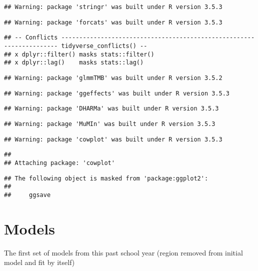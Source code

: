 \documentclass[]{article}
\begin{document}
\begin{verbatim}
## Warning: package 'stringr' was built under R version 3.5.3
\end{verbatim}

\begin{verbatim}
## Warning: package 'forcats' was built under R version 3.5.3
\end{verbatim}

\begin{verbatim}
## -- Conflicts --------------------------------------------------------------------- tidyverse_conflicts() --
## x dplyr::filter() masks stats::filter()
## x dplyr::lag()    masks stats::lag()
\end{verbatim}

\begin{verbatim}
## Warning: package 'glmmTMB' was built under R version 3.5.2
\end{verbatim}

\begin{verbatim}
## Warning: package 'ggeffects' was built under R version 3.5.3
\end{verbatim}

\begin{verbatim}
## Warning: package 'DHARMa' was built under R version 3.5.3
\end{verbatim}

\begin{verbatim}
## Warning: package 'MuMIn' was built under R version 3.5.3
\end{verbatim}

\begin{verbatim}
## Warning: package 'cowplot' was built under R version 3.5.3
\end{verbatim}

\begin{verbatim}
## 
## Attaching package: 'cowplot'
\end{verbatim}

\begin{verbatim}
## The following object is masked from 'package:ggplot2':
## 
##     ggsave
\end{verbatim}

\section{Models}\label{models}

The first set of models from this past school year (region removed from
initial model and fit by itself)
\end{document}

